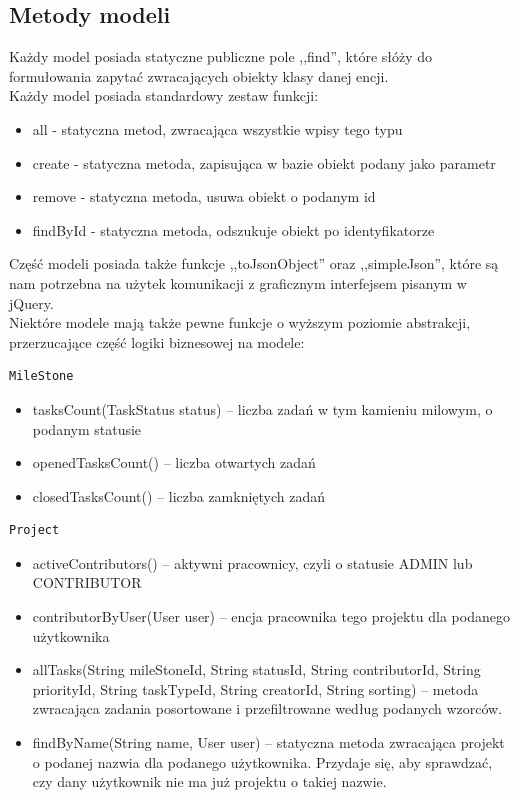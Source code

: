 \documentclass[a4paper,12pt,notitlepage]{mwrep}
\begin{document}
\subsection{Metody modeli}
Każdy model posiada statyczne publiczne pole ,,find'', które słóży do formułowania zapytać zwracających obiekty klasy danej encji.\\
Każdy model posiada standardowy zestaw funkcji:
\begin{itemize}
	\item	all - statyczna metod, zwracająca wszystkie wpisy tego typu
	\item	create - statyczna metoda, zapisująca w bazie obiekt podany jako parametr
	\item	remove - statyczna metoda, usuwa obiekt o podanym id
	\item	findById - statyczna metoda, odszukuje obiekt po identyfikatorze
\end{itemize}
Część modeli posiada także funkcje ,,toJsonObject'' oraz ,,simpleJson'', które są nam potrzebna na użytek komunikacji z graficznym interfejsem 
pisanym w jQuery. \\
Niektóre modele mają także pewne funkcje o wyższym poziomie abstrakcji, przerzucające część logiki biznesowej na modele:

\begin{verbatim}MileStone\end{verbatim}
\begin{itemize}
	\item	tasksCount(TaskStatus status) -- liczba zadań w tym kamieniu milowym, o podanym statusie
	\item	openedTasksCount() -- liczba otwartych zadań
	\item	closedTasksCount() -- liczba zamkniętych zadań
\end{itemize}

\begin{verbatim}Project\end{verbatim}
\begin{itemize}
	\item	activeContributors() -- aktywni pracownicy, czyli o statusie ADMIN lub CONTRIBUTOR
	\item	contributorByUser(User user) -- encja pracownika tego projektu dla podanego użytkownika
	\item	allTasks(String mileStoneId, String statusId,
String contributorId, String priorityId, String taskTypeId,
String creatorId, String sorting) -- metoda zwracająca zadania posortowane i przefiltrowane według podanych wzorców.
	\item	findByName(String name, User user) -- statyczna metoda zwracająca projekt o podanej nazwia dla podanego użytkownika. Przydaje się, 
		aby sprawdzać, czy dany użytkownik nie ma już projektu o takiej nazwie.
\end{itemize}
\end{document}

